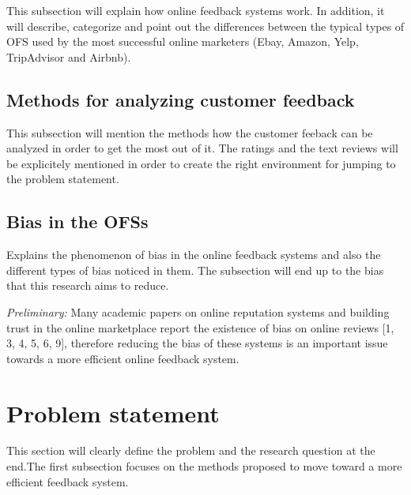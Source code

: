 \documentclass[a4paper, 11pt]{article}
\begin{document}
This subsection will explain how online feedback systems work. In addition, it will describe, categorize and point out the differences between the typical types of OFS used by the most successful online marketers (Ebay, Amazon, Yelp, TripAdvisor and Airbnb). 

\subsection{Methods for analyzing customer feedback}
\label{subsec:feedbackmethods}
This subsection will mention the methods how the customer feeback can be analyzed in order to get the most out of it. The ratings and the text reviews will be explicitely mentioned in order to create the right environment for jumping to the problem statement.

\subsection{Bias in the OFSs}
\label{subsec:bias}
Explains the phenomenon of bias in the online feedback systems and also the different types of bias noticed in them. The subsection will end up to the bias that this research aims to reduce.

\textit{Preliminary:} Many academic papers on online reputation systems and building trust in the online marketplace report the existence of bias on online reviews [1, 3, 4, 5, 6, 9], therefore reducing the bias of these systems is an important issue towards a more efficient online feedback system. 

\section{Problem statement}
\label{sec:problemstatement}
This section will clearly define the problem and the research question at the end.The first subsection focuses on the methods proposed to move toward a more efficient feedback system.
\end{document}
